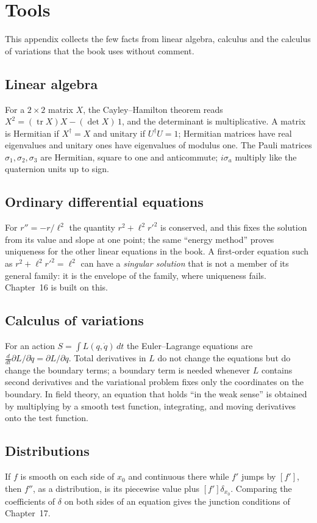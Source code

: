 \chapter{Tools}\label{app:A}

This appendix collects the few facts from linear algebra, calculus and the calculus of variations that the book uses without comment.

\section*{Linear algebra}
For a $2\times2$ matrix $X$, the Cayley--Hamilton theorem reads $X^2=(\operatorname{tr}X)X-(\det X)\,1$, and the determinant is multiplicative. A matrix is Hermitian if $X^\dagger=X$ and unitary if $U^\dagger U=1$; Hermitian matrices have real eigenvalues and unitary ones have eigenvalues of modulus one. The Pauli matrices $\sigma_1,\sigma_2,\sigma_3$ are Hermitian, square to one and anticommute; $i\sigma_a$ multiply like the quaternion units up to sign.

\section*{Ordinary differential equations}
For $r''=-r/\ell^2$ the quantity $r^2+\ell^2r'^2$ is conserved, and this fixes the solution from its value and slope at one point; the same ``energy method'' proves uniqueness for the other linear equations in the book. A first-order equation such as $r^2+\ell^2r'^2=\ell^2$ can have a \emph{singular solution} that is not a member of its general family: it is the envelope of the family, where uniqueness fails. Chapter~16 is built on this.

\section*{Calculus of variations}
For an action $S=\int L(q,\dot q)\,dt$ the Euler--Lagrange equations are $\frac{d}{dt}\partial L/\partial\dot q=\partial L/\partial q$. Total derivatives in $L$ do not change the equations but do change the boundary terms; a boundary term is needed whenever $L$ contains second derivatives and the variational problem fixes only the coordinates on the boundary. In field theory, an equation that holds ``in the weak sense'' is obtained by multiplying by a smooth test function, integrating, and moving derivatives onto the test function.

\section*{Distributions}
If $f$ is smooth on each side of $x_0$ and continuous there while $f'$ jumps by $[f']$, then $f''$, as a distribution, is its piecewise value plus $[f']\delta_{x_0}$. Comparing the coefficients of $\delta$ on both sides of an equation gives the junction conditions of Chapter~17.
